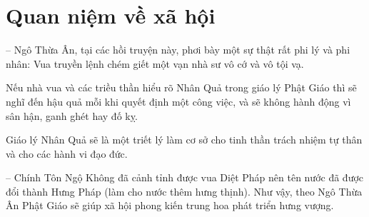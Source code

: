 \section{Quan niệm về xã hội} %
\label{sec:84_85_xa_hoi}

-- Ngô Thừa Ân, tại các hồi truyện này, phơi bày một sự thật rất phi lý và phi nhân: Vua truyền lệnh chém giết một vạn nhà sư vô cớ và vô tội vạ.

Nếu nhà vua và các triều thần hiểu rõ Nhân Quả trong giáo lý Phật Giáo thì sẽ nghĩ đến hậu quả mỗi khi quyết định một công việc, và sẽ không hành động vì sân hận, ganh ghét hay đố kỵ.

Giáo lý Nhân Quả sẽ là một triết lý làm cơ sở cho tinh thần trách nhiệm tự thân và cho các hành vi đạo đức.

-- Chính Tôn Ngộ Không đã cảnh tỉnh được vua Diệt Pháp nên tên nước đã được đổi thành Hưng Pháp (làm cho nước thêm hưng thịnh). Như vậy, theo Ngô Thừa Ân Phật Giáo sẽ giúp xã hội phong kiến trung hoa phát triển hưng vượng.
